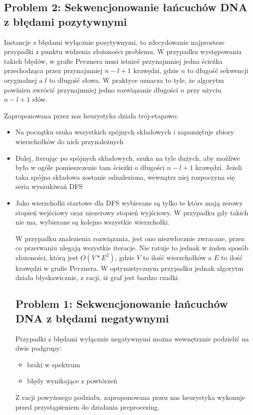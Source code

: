 \documentclass[a4paper]{article}
\begin{document}
\subsection{Problem 2: Sekwencjonowanie łańcuchów DNA z błędami pozytywnymi}
Instancje z błędami wyłącznie pozytywnymi, to zdecydowanie najprostsze przypadki z punktu widzenia złożoności problemu.
W przypadku występowania takich błędów, w grafie Pevznera musi istnieć przynajmniej jedna ścieżka przechodząca przez
przynajmniej $n-l+1$ krawędzi, gdzie $n$ to długość sekwencji oryginalnej a $l$ to długość słowa. W praktyce oznacza to tyle,
że algorytm powinien zwrócić przynajmniej jedno rozwiązanie długości $n$ przy użyciu $n-l+1$ słów.

Zaproponowana przez nas heurystyka działa trój-etapowo:
\begin{itemize}
\item Na początku szuka wszystkich spójnych składowych i zapamiętuje zbiory wierzchołków do nich przynależnych
\item Dalej, iterując po spójnych składowych, szuka na tyle dużych, aby możliwe było w ogóle pomieszczenie tam ścieżki
o długości $n-l+1$ krawędzi. Jeżeli taka spójna składowa zostanie odnaleziona, wewnątrz niej rozpoczyna się seria
wyszukiwań DFS
\item Jako wierzchołki startowe dla DFS wybierane są tylko te które mają zerowy stopień wejściowy oraz niezerowy
stopień wyjściowy. W przypadku gdy takich nie ma, wybierane są kolejno wszystkie wierzchołki.

W przypadku znalezienia rozwiązania, jest ono niezwłocznie zwracane, przez co przerwaniu ulegają wszystkie iteracje.
Nie ratuje to jednak w żaden sposób złożoności, którą jest $O(V*E^2)$, gdzie $V$ to ilość wierzchołków a $E$ to ilość
krawędzi w grafie Pevznera. W optymistycznym przypadku jednak algorytm działa błyskawicznie, z racji, iż graf jest
bardzo rzadki.

\subsection{Problem 1: Sekwencjonowanie łańcuchów DNA z błędami negatywnymi}
Przypadki z błędami wyłącznie negatywnymi można wewnętrznie podzielić na dwie podgrupy:
\begin{itemize}
\item braki w spektrum
\item błędy wynikające z powtórzeń
\end{itemize}
Z racji powyższego podziału, zaproponowana przez nas heurystyka wykonuje przed przystąpieniem do działania preprocesing.


\end{itemize}
\end{document}
